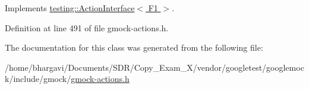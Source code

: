 Implements \hyperlink{classtesting_1_1_action_interface_a20f8624fcea1786f2992b358760422a0}{testing\+::\+Action\+Interface$<$ F1 $>$}.



Definition at line 491 of file gmock-\/actions.\+h.



The documentation for this class was generated from the following file\+:\begin{DoxyCompactItemize}
\item 
/home/bhargavi/\+Documents/\+S\+D\+R/\+Copy\+\_\+\+Exam\+\_\+X/vendor/googletest/googlemock/include/gmock/\hyperlink{gmock-actions_8h}{gmock-\/actions.\+h}\end{DoxyCompactItemize}
